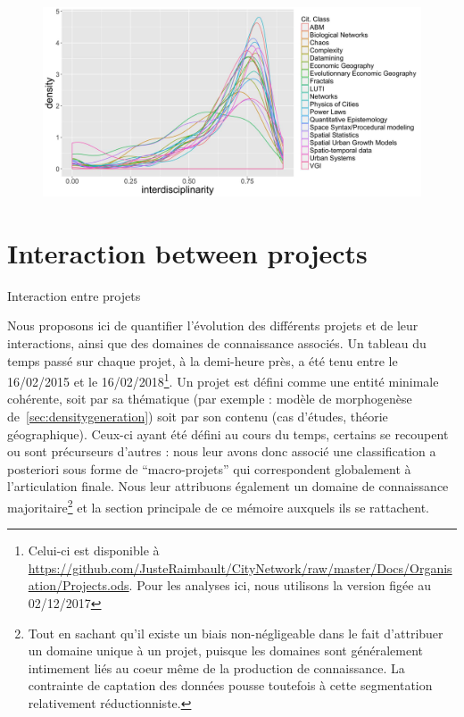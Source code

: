 \begin{figure}
	\includegraphics[width=\linewidth]{Figures/Final/F-reflexivity-interdisc.jpg}
\end{figure}








\section{Interaction between projects}{Interaction entre projets}


Nous proposons ici de quantifier l'évolution des différents projets et de leur interactions, ainsi que des domaines de connaissance associés. Un tableau du temps passé sur chaque projet, à la demi-heure près, a été tenu entre le 16/02/2015 et le 16/02/2018\footnote{Celui-ci est disponible à \url{https://github.com/JusteRaimbault/CityNetwork/raw/master/Docs/Organisation/Projects.ods}. Pour les analyses ici, nous utilisons la version figée au 02/12/2017}. Un projet est défini comme une entité minimale cohérente, soit par sa thématique (par exemple : modèle de morphogenèse de~\ref{sec:densitygeneration}) soit par son contenu (cas d'études, théorie géographique). Ceux-ci ayant été défini au cours du temps, certains se recoupent ou sont précurseurs d'autres : nous leur avons donc associé une classification a posteriori sous forme de ``macro-projets'' qui correspondent globalement à l'articulation finale. Nous leur attribuons également un domaine de connaissance majoritaire\footnote{Tout en sachant qu'il existe un biais non-négligeable dans le fait d'attribuer un domaine unique à un projet, puisque les domaines sont généralement intimement liés au coeur même de la production de connaissance. La contrainte de captation des données pousse toutefois à cette segmentation relativement réductionniste.} et la section principale de ce mémoire auxquels ils se rattachent.


